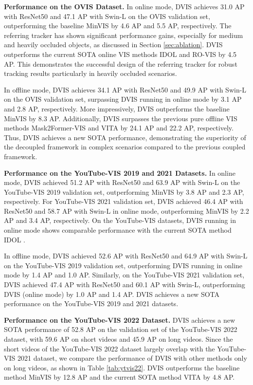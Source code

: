 \documentclass[10pt,twocolumn,letterpaper]{article}
\begin{document}
\textbf{Performance on the OVIS Dataset.} In online mode, DVIS achieves 31.0 AP with ResNet50 and 47.1 AP with Swin-L on the OVIS validation set, outperforming the baseline MinVIS \cite{minvis} by 4.6 AP and 5.5 AP, respectively. The referring tracker has shown significant performance gains, especially for medium and heavily occluded objects, as discussed in Section \ref{sec:ablation}. DVIS outperforms the current SOTA online VIS methods IDOL \cite{idol} and RO-VIS \cite{rovis} by 4.5 AP. This demonstrates the successful design of the referring tracker for robust tracking results particularly in heavily occluded scenarios.

In offline mode, DVIS achieves 34.1 AP with ResNet50 and 49.9 AP with Swin-L on the OVIS validation set, surpassing DVIS running in online mode by 3.1 AP and 2.8 AP, respectively. More impressively, DVIS outperforms the baseline MinVIS by 8.3 AP. Additionally, DVIS surpasses the previous pure offline VIS methods Mask2Former-VIS \cite{mask2formervis} and VITA \cite{vita} by 24.1 AP and 22.2 AP, respectively. Thus, DVIS achieves a new SOTA performance, demonstrating the superiority of the decoupled framework in complex scenarios compared to the previous coupled framework.

\textbf{Performance on the YouTube-VIS 2019 and 2021 Datasets.} In online mode, DVIS achieved 51.2 AP with ResNet50 and 63.9 AP with Swin-L on the YouTube-VIS 2019 validation set, outperforming MinVIS \cite{minvis} by 3.8 AP and 2.3 AP, respectively. For YouTube-VIS 2021 validation set, DVIS achieved 46.4 AP with ResNet50 and 58.7 AP with Swin-L in online mode, outperforming MinVIS \cite{minvis} by 2.2 AP and 3.4 AP, respectively. On the YouTube-VIS datasets, DVIS running in online mode shows comparable performance with the current SOTA method IDOL \cite{idol}.

In offline mode, DVIS achieved 52.6 AP with ResNet50 and 64.9 AP with Swin-L on the YouTube-VIS 2019 validation set, outperforming DVIS running in online mode by 1.4 AP and 1.0 AP. Similarly, on the YouTube-VIS 2021 validation set, DVIS achieved 47.4 AP with ResNet50 and 60.1 AP with Swin-L, outperforming DVIS (online mode) by 1.0 AP and 1.4 AP. DVIS achieves a new SOTA performance on the YouTube-VIS 2019 and 2021 datasets.

\textbf{Performance on the YouTube-VIS 2022 Dataset.} DVIS achieves a new SOTA performance of 52.8 AP on the validation set of the YouTube-VIS 2022 dataset, with 59.6 AP on short videos and 45.9 AP on long videos. Since the short videos of the YouTube-VIS 2022 dataset largely overlap with the YouTube-VIS 2021 dataset, we compare the performance of DVIS with other methods only on long videos, as shown in Table \ref{tab:ytvis22}. DVIS outperforms the baseline method MinVIS \cite{minvis} by 12.8 AP and the current SOTA method VITA \cite{vita} by 4.8 AP.
\end{document}

